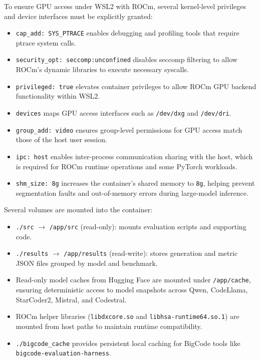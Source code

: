 To ensure GPU access under WSL2 with ROCm, several kernel-level privileges and device interfaces must be explicitly granted:
\begin{itemize}
	\item \texttt{cap\_add: SYS\_PTRACE} enables debugging and profiling tools that require ptrace system calls.
	\item \texttt{security\_opt: seccomp:unconfined} disables seccomp filtering to allow ROCm’s dynamic libraries to execute necessary syscalls.
	\item \texttt{privileged: true} elevates container privileges to allow ROCm GPU backend functionality within WSL2.
	\item \texttt{devices} maps GPU access interfaces such as \texttt{/dev/dxg} and \texttt{/dev/dri}.
	\item \texttt{group\_add: video} ensures group-level permissions for GPU access match those of the host user session.
	\item \texttt{ipc: host} enables inter-process communication sharing with the host, which is required for ROCm runtime operations and some PyTorch workloads.
	\item \texttt{shm\_size: 8g} increases the container’s shared memory to \texttt{8g}, helping prevent segmentation faults and out-of-memory errors during large-model inference.
\end{itemize}

Several volumes are mounted into the container:
\begin{itemize}
	\item \texttt{./src} $\rightarrow$ \texttt{/app/src} (read-only): mounts evaluation scripts and supporting code.
	\item \texttt{./results} $\rightarrow$ \texttt{/app/results} (read-write): stores generation and metric JSON files grouped by model and benchmark.
	\item Read-only model caches from Hugging Face are mounted under \texttt{/app/cache}, ensuring deterministic access to model snapshots across Qwen, CodeLlama, StarCoder2, Mistral, and Codestral.
	\item ROCm helper libraries (\texttt{libdxcore.so} and \texttt{libhsa-runtime64.so.1}) are mounted from host paths to maintain runtime compatibility.
	\item \texttt{./bigcode\_cache} provides persistent local caching for BigCode tools like \texttt{bigcode-evaluation-harness}.
\end{itemize}


